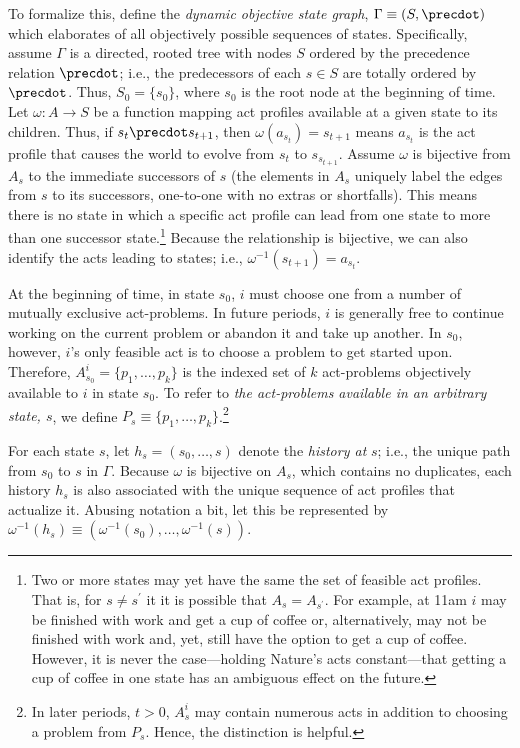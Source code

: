 \documentclass[
11pt,
titlepage,
reqno,
]{article}%
\theoremstyle{definition}
\begin{document}
To formalize this,  define the \textit{dynamic objective state graph},  $\Gamma\equiv( S,\precdot)$ which elaborates of all objectively possible sequences of states.
Specifically, assume $\Gamma$ is a directed, rooted tree with nodes $S$ ordered by the precedence relation $\precdot$; i.e., the predecessors of each $s\in S$ are totally ordered by $\precdot$. 
Thus, $S_0=\{s_0\}$, where $s_0$ is the root node at the beginning of time.
Let $\omega:A\rightarrow S$ be a function mapping act profiles available at a given state to its children.	
Thus, if $s_t\precdot s_{t+1}$, then $\omega(a_{s_t})=s_{t+1}$ means  $a_{s_t}$ is the act profile that causes the world to evolve from $s_t$ to $s_{s_{t+1}}$.
Assume $\omega$ is bijective from $A_s$ to the immediate successors of $s$ (the elements in $A_s$ uniquely label the edges from $s$ to its successors, one-to-one with no extras or shortfalls).
This means there is no state in which a specific act profile can lead from one state to more than one successor state.\footnote
{ 
	Two or more states may yet have the same the set of feasible act profiles. That is, for $s\ne s^\prime$ it it is possible that $A_s=A_{s^\prime}$. For example, at 11am $i$ may be finished with  work and get a cup of coffee or, alternatively, may not be finished with work and, yet, still have the option to get a cup of coffee. However, it is never the case---holding Nature's acts constant---that getting a cup of coffee in one state has an ambiguous effect on the future.
}
Because the relationship is bijective, we can also identify the acts leading to states; i.e., $\omega^{-1}(s_{t+1})=a_{s_t}$.

At the beginning of time, in state $s_0$, $i$ must choose one from  a number of mutually exclusive act-problems.
In future periods, $i$ is generally free to continue working on the current problem or abandon it and take up another. 
In $s_0$, however, $i$'s only feasible act is to choose a problem to get started upon. 
Therefore, $A^i_{s_0}=\{p_1,\ldots,p_k\}$ is the indexed set of $k$ act-problems objectively available to $i$ in state $s_0$.
To refer to \textit{the act-problems available in an arbitrary state, $s$}, we define $P_s\equiv \{p_1,\ldots,p_k\}$.\footnote
{
	In later periods, $t>0$, $A^i_s$ may contain numerous acts in addition to choosing a problem from $P_s$. Hence, the distinction is helpful.
}
	
For each state $s$, let $h_s=(s_0,\ldots,s)$ denote the \textit{history at} $s$; i.e., the unique path from $s_0$ to $s$ in $\Gamma$.
Because $\omega$ is bijective on $A_s$, which contains no duplicates, each history $h_s$ is also associated with the unique sequence of act profiles that actualize it.
Abusing notation a bit, let this be represented by  $\omega^{-1}(h_s)\equiv(\omega^{-1}(s_0),\ldots,\omega^{-1}(s))$.
\end{document}
